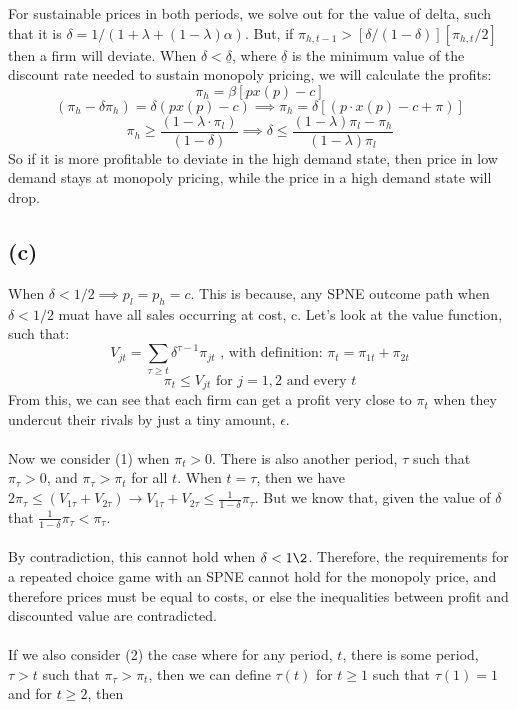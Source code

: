 \documentclass{article}
\begin{document}
For sustainable prices in both periods, we solve out for the value of delta, such that it is $\delta = 1/(1 + \lambda + (1-\lambda)\alpha)$. But, if $\pi_{h,t-1} > [\delta/(1-\delta)][\pi_{h,t}/2]$ then a firm will deviate. When $\delta < \underline{\delta}$, where $\underline{\delta}$ is the minimum value of the discount rate needed to sustain monopoly pricing, we will calculate the profits: 
\[
\pi_h = \beta[px(p)-c]
\]
\[
(\pi_h - \delta\pi_h) = \delta(px(p)-c) \implies \pi_h = \delta[(p\cdot x(p) - c + \pi)]
\]
\[
\pi_h \geq \frac{(1-\lambda\cdot\pi_l)}{(1-\delta)} \implies \delta \leq \frac{(1-\lambda)\pi_l - \pi_h}{(1-\lambda)\pi_l}
\]
So if it is more profitable to deviate in the high demand state, then price in low demand stays at monopoly pricing, while the price in a high demand state will drop. 

\subsection*{(c)}
When $\delta < 1/2 \implies p_l = p_h = c$. This is because, any SPNE outcome path when $\delta < 1/2$ muat have all sales occurring at cost, c. Let's look at the value function, such that: 
\[
V_{jt} = \sum_{\tau \geq t}\delta^{\tau-1}\pi_{jt} \text{ , with definition: } \pi_t = \pi_{1t} + \pi_{2t}
\]
\[\pi_t \leq V_{jt} \text{ for } j = 1,2 \text{ and every }t 
\]
From this, we can see that each firm can get a profit very close to $\pi_t$ when they undercut their rivals by just a tiny amount, $\epsilon$. \\
\\
Now we consider (1) when $\pi_t > 0$. There is also another period, $\tau$ such that $\pi_{\tau} > 0$, and  $\pi_{\tau} > \pi_{t}$ for all $t$. When $t = \tau$, then we have $2\pi_{\tau} \leq (V_{1\tau} + V_{2\tau}) \rightarrow V_{1\tau} + V_{2\tau} \leq \frac{1}{1-\delta}\pi_{\tau}$. But we know that, given the value of $\delta$ that $\frac{1}{1-\delta}\pi_{\tau} < \pi_{\tau}$.  \\ 
\\
By contradiction, this cannot hold when $\delta < 1\2$. Therefore, the requirements for a repeated choice game with an SPNE cannot hold for the monopoly price, and therefore prices must be equal to costs, or else the inequalities between profit and discounted value are contradicted. \\
\\
If we also consider (2) the case where for any period, $t$, there is some period, $\tau > t$ such that $\pi_{\tau} > \pi_t$, then we can define $\tau(t)$ for $t \geq 1$ such that $\tau(1) = 1$ and for $t \geq 2$, then 
\end{document}
